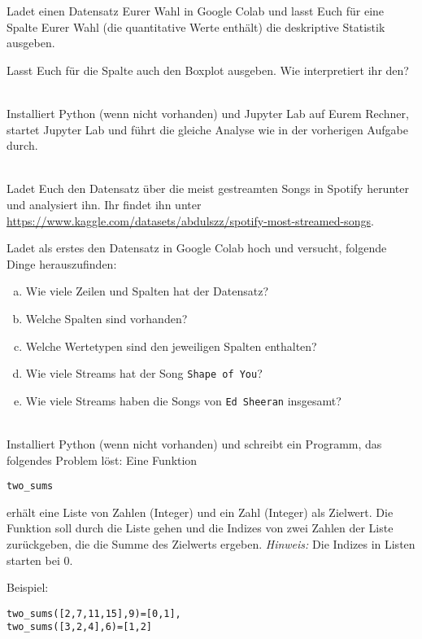 Ladet einen Datensatz Eurer Wahl in Google Colab und lasst Euch für eine Spalte Eurer Wahl (die quantitative Werte enthält) die deskriptive Statistik ausgeben.

Lasst Euch für die Spalte auch den Boxplot ausgeben. Wie interpretiert ihr den?

\\
Installiert Python (wenn nicht vorhanden) und Jupyter Lab auf Eurem Rechner, startet Jupyter Lab und führt die gleiche Analyse wie in der vorherigen Aufgabe durch.

\\
Ladet Euch den  Datensatz über die meist gestreamten Songs in Spotify herunter und analysiert ihn. Ihr findet ihn unter \url{https://www.kaggle.com/datasets/abdulszz/spotify-most-streamed-songs}.

Ladet als erstes den Datensatz in Google Colab hoch und versucht, folgende Dinge herauszufinden:
\begin{enumerate}[a)]
  \item Wie viele Zeilen und Spalten hat der Datensatz?
  \item Welche Spalten sind vorhanden?
  \item Welche Wertetypen sind den jeweiligen Spalten enthalten?
  \item Wie viele Streams hat der Song \texttt{Shape of You}?
  \item Wie viele Streams haben die Songs von \texttt{Ed Sheeran} insgesamt?
\end{enumerate}

\\
Installiert Python (wenn nicht vorhanden) und schreibt ein Programm, das folgendes Problem löst:
Eine Funktion \begin{verbatim}two_sums\end{verbatim} erhält eine Liste von Zahlen (Integer) und ein Zahl (Integer) als Zielwert. Die Funktion soll durch die Liste gehen und die Indizes von zwei Zahlen der Liste zurückgeben, die die Summe des Zielwerts ergeben. 
\textit{Hinweis:} Die Indizes in Listen starten bei 0.

Beispiel:
\begin{verbatim}
two_sums([2,7,11,15],9)=[0,1],
two_sums([3,2,4],6)=[1,2]
\end{verbatim}
  


